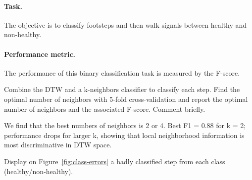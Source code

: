 \documentclass[11pt]{article}
\begin{document}
\paragraph{Task.} The objective is to classify footsteps and then walk signals between healthy and non-healthy.

\paragraph{Performance metric.} The performance of this binary classification task is measured by the F-score.


\begin{exercise}
Combine the DTW and a k-neighbors classifier to classify each step. Find the optimal number of neighbors with 5-fold cross-validation and report the optimal number of neighbors and the associated F-score. Comment briefly.
\end{exercise}

\begin{solution}
    We find that the best numbers of neighbors is 2 or 4. 
    Best F1 = 0.88 for k = 2; performance drops for larger k, showing that local neighborhood information is most discriminative in DTW space.

\end{solution}

\newpage
\begin{exercise}\label{q:class-errors}
Display on Figure~\ref{fig:class-errors} a badly classified step from each class (healthy/non-healthy).
\end{exercise}

\end{document}
